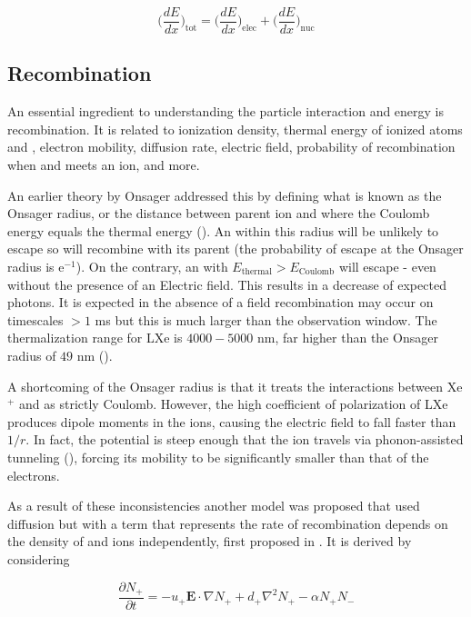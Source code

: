 \begin{equation}
\bigg( \frac{dE}{dx} \bigg)_{\mathrm{tot}} = \bigg( \frac{dE}{dx} \bigg)_{\mathrm{elec}} + \bigg( \frac{dE}{dx} \bigg)_{\mathrm{nuc}}
\end{equation}



\subsection{Recombination}
\label{subsec:recombination}
An essential ingredient to understanding the particle interaction and energy is recombination.  It is related to ionization density,
thermal energy of ionized atoms and \electron, electron mobility, diffusion rate, electric field, probability of recombination when
and \electron meets an ion, and more.

An earlier theory by Onsager addressed this by defining what is known
as the Onsager radius, or the distance between parent
ion and \electron where the Coulomb energy equals the \electron thermal energy ().  An \electron within this
radius will be unlikely to
escape so will recombine with its parent (the probability of escape at the Onsager radius is e$^{-1}$).  On the contrary, an \electron
with $E_{\mathrm{thermal}} > E_{\mathrm{Coulomb}}$ will escape - even without the presence of an Electric field.  This results in a decrease of expected
photons.  It is expected in the absence of a field recombination may occur on timescales $> 1$ ms but this is much larger than the
observation window.  The thermalization range for LXe is $4000-5000$ nm, far higher than the Onsager radius of $49$ nm
().

A shortcoming of the Onsager radius is that it treats the interactions between Xe$^{+}$ and \electron as strictly Coulomb.  However,
the high coefficient of polarization of LXe produces dipole moments in the ions, causing the electric field to fall faster than
$1/r$.  In fact, the potential is steep enough that the ion travels via phonon-assisted tunneling (), forcing its
mobility to be significantly smaller than that of the electrons.

As a result of these inconsistencies another model was proposed that used diffusion but with a term that represents the rate of
recombination depends on
the density of \electron and ions independently, first proposed in .  It is derived by considering

\begin{equation}
\frac{\partial N_{+}}{\partial t} = -u_{+} \mathbf{E} \cdot \nabla N_{+} + d_{+} \nabla^{2} N_{+} - \alpha N_{+} N_{-}
\label{eq:diff_plus}
\end{equation}

